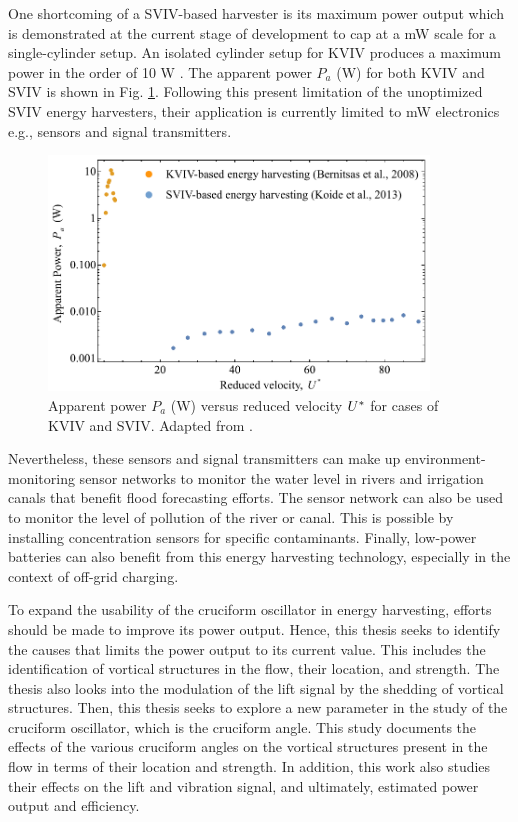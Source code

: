 \documentclass[oneside]{utmthesis}
\begin{document}
One shortcoming of a SVIV-based harvester is its maximum power output which is demonstrated at the current stage of development to cap at a mW scale for a single-cylinder setup. An isolated cylinder setup for KVIV produces a maximum power in the order of 10 W \citep{Bernitsas2009}. The apparent power $P_a$ (W) for both KVIV and SVIV is shown in Fig. \ref{fig:apparentPowerKoide}. Following this present limitation of the unoptimized SVIV energy harvesters, their application is currently limited to mW electronics e.g., sensors and signal transmitters.

\begin{figure}[H]
  \centering
  \includegraphics[width=0.9\textwidth]{figs/apparentPowerKoide}
  \caption{Apparent power $P_a $ (W) versus reduced velocity $U^{*}$ for cases of KVIV and SVIV. Adapted from \citet{Koide2013}.}
  \label{fig:apparentPowerKoide}
\end{figure}

Nevertheless, these sensors and signal transmitters can make up environment-monitoring sensor networks to monitor the water level in rivers and irrigation canals that benefit flood forecasting efforts. The sensor network can also be used to monitor the level of pollution of the river or canal. This is possible by installing concentration sensors for specific contaminants. Finally, low-power batteries can also benefit from this energy harvesting technology, especially in the context of off-grid charging.

 To expand the usability of the cruciform oscillator in energy harvesting, efforts should be made to improve its power output. Hence, this thesis seeks to identify the causes that limits the power output to its current value. This includes the identification of vortical structures in the flow, their location, and strength. The thesis also looks into the modulation of the lift signal by the shedding of vortical structures. Then, this thesis seeks to explore a new parameter in the study of the cruciform oscillator, which is the cruciform angle. This study documents the effects of the various cruciform angles on the vortical structures present in the flow in terms of their location and strength. In addition, this work also studies their effects on the lift and vibration signal, and ultimately, estimated power output and efficiency.
\end{document}
